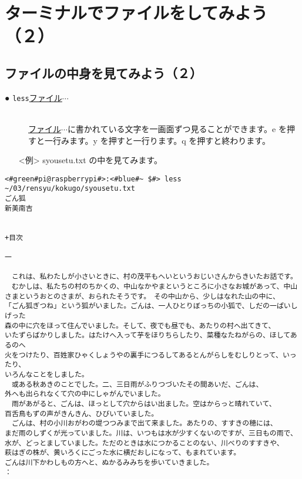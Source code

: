 \newpage
\section{ターミナルでファイルをしてみよう（２）}

\subsection{ファイルの中身を見てみよう（２）}
\begin{description}
\item[● \texttt{less}\textvisiblespace \underline{ファイル}$\cdots$]\mbox{}\\
\underline{ファイル}$\cdots$に書かれている文字を一画面ずつ見ることができます。e を押すと一行みます。y を押すと一行ります。q を押すと終わります。

\end{description}
\begin{itemize}
\item[<例>]syousetu.txt の中を見てみます。
\end{itemize}
\begin{lstlisting}[caption=lessの例, label=less]
<#green#pi@raspberrypi#>:<#blue#~ $#> less ~/03/rensyu/kokugo/syousetu.txt
ごん狐
新美南吉


+目次

一

　これは、私わたしが小さいときに、村の茂平もへいというおじいさんからきいたお話です。
　むかしは、私たちの村のちかくの、中山なかやまというところに小さなお城があって、中山
さまというおとのさまが、おられたそうです。　その中山から、少しはなれた山の中に、
「ごん狐ぎつね」という狐がいました。ごんは、一人ひとりぼっちの小狐で、しだの一ぱいしげった
森の中に穴をほって住んでいました。そして、夜でも昼でも、あたりの村へ出てきて、
いたずらばかりしました。はたけへ入って芋をほりちらしたり、菜種なたねがらの、ほしてあるのへ
火をつけたり、百姓家ひゃくしょうやの裏手につるしてあるとんがらしをむしりとって、いったり、
いろんなことをしました。
　或ある秋あきのことでした。二、三日雨がふりつづいたその間あいだ、ごんは、
外へも出られなくて穴の中にしゃがんでいました。
　雨があがると、ごんは、ほっとして穴からはい出ました。空はからっと晴れていて、
百舌鳥もずの声がきんきん、ひびいていました。
　ごんは、村の小川おがわの堤つつみまで出て来ました。あたりの、すすきの穂には、
まだ雨のしずくが光っていました。川は、いつもは水が少すくないのですが、三日もの雨で、
水が、どっとましていました。ただのときは水につかることのない、川べりのすすきや、
萩はぎの株が、黄いろくにごった水に横だおしになって、もまれています。
ごんは川下かわしもの方へと、ぬかるみみちを歩いていきました。
：
\end{lstlisting}

